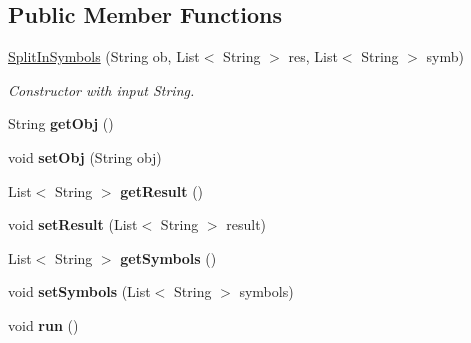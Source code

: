 \subsection*{Public Member Functions}
\begin{DoxyCompactItemize}
\item 
\hyperlink{classinput_parser_1_1_split_in_symbols_a0426f5d1c5abebe971c5042584896bd0}{Split\-In\-Symbols} (String ob, List$<$ String $>$ res, List$<$ String $>$ symb)
\begin{DoxyCompactList}\small\item\em Constructor with input String. \end{DoxyCompactList}\item 
\hypertarget{classinput_parser_1_1_split_in_symbols_a419914a0af2b9917ec7f245c72f8ac65}{String {\bfseries get\-Obj} ()}\label{classinput_parser_1_1_split_in_symbols_a419914a0af2b9917ec7f245c72f8ac65}

\item 
\hypertarget{classinput_parser_1_1_split_in_symbols_afab6c86b9a0d9ddce2110ea7003f1a9a}{void {\bfseries set\-Obj} (String obj)}\label{classinput_parser_1_1_split_in_symbols_afab6c86b9a0d9ddce2110ea7003f1a9a}

\item 
\hypertarget{classinput_parser_1_1_split_in_symbols_aeb0d82f69538d93f7843c8e07f683be6}{List$<$ String $>$ {\bfseries get\-Result} ()}\label{classinput_parser_1_1_split_in_symbols_aeb0d82f69538d93f7843c8e07f683be6}

\item 
\hypertarget{classinput_parser_1_1_split_in_symbols_a91749a4348dc4542c181589b0f8fcb6f}{void {\bfseries set\-Result} (List$<$ String $>$ result)}\label{classinput_parser_1_1_split_in_symbols_a91749a4348dc4542c181589b0f8fcb6f}

\item 
\hypertarget{classinput_parser_1_1_split_in_symbols_a6b85028a2a6f905c8954627eaf9fa593}{List$<$ String $>$ {\bfseries get\-Symbols} ()}\label{classinput_parser_1_1_split_in_symbols_a6b85028a2a6f905c8954627eaf9fa593}

\item 
\hypertarget{classinput_parser_1_1_split_in_symbols_ab18a4792f9c967da3a19763f15cc7ff5}{void {\bfseries set\-Symbols} (List$<$ String $>$ symbols)}\label{classinput_parser_1_1_split_in_symbols_ab18a4792f9c967da3a19763f15cc7ff5}

\item 
\hypertarget{classinput_parser_1_1_split_in_symbols_ab532f7e0cb477fb03d8fca03505161ba}{void {\bfseries run} ()}\label{classinput_parser_1_1_split_in_symbols_ab532f7e0cb477fb03d8fca03505161ba}

\end{DoxyCompactItemize}
